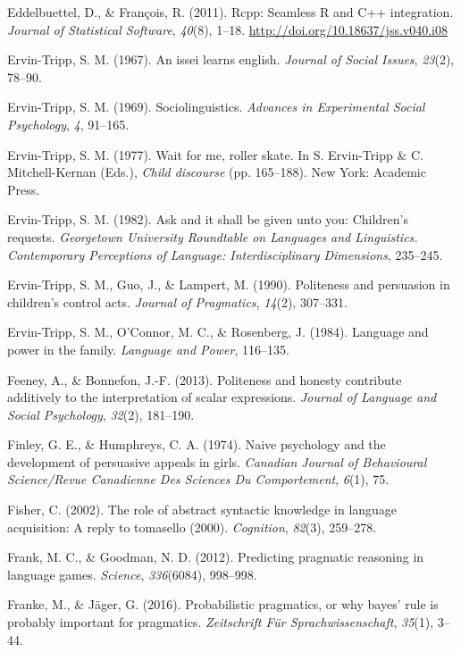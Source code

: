 \documentclass[oneside]{report}
\begin{document}
\hypertarget{ref-R-Rcpp_a}{}
Eddelbuettel, D., \& François, R. (2011). Rcpp: Seamless R and C++
integration. \emph{Journal of Statistical Software}, \emph{40}(8),
1--18. \url{http://doi.org/10.18637/jss.v040.i08}

\hypertarget{ref-ervin1967}{}
Ervin-Tripp, S. M. (1967). An issei learns english. \emph{Journal of
Social Issues}, \emph{23}(2), 78--90.

\hypertarget{ref-ervin1969}{}
Ervin-Tripp, S. M. (1969). Sociolinguistics. \emph{Advances in
Experimental Social Psychology}, \emph{4}, 91--165.

\hypertarget{ref-ervin1977}{}
Ervin-Tripp, S. M. (1977). Wait for me, roller skate. In S. Ervin-Tripp
\& C. Mitchell-Kernan (Eds.), \emph{Child discourse} (pp. 165--188). New
York: Academic Press.

\hypertarget{ref-ervin1982}{}
Ervin-Tripp, S. M. (1982). Ask and it shall be given unto you:
Children's requests. \emph{Georgetown University Roundtable on Languages
and Linguistics. Contemporary Perceptions of Language: Interdisciplinary
Dimensions}, 235--245.

\hypertarget{ref-ervin1990}{}
Ervin-Tripp, S. M., Guo, J., \& Lampert, M. (1990). Politeness and
persuasion in children's control acts. \emph{Journal of Pragmatics},
\emph{14}(2), 307--331.

\hypertarget{ref-ervin1984}{}
Ervin-Tripp, S. M., O'Connor, M. C., \& Rosenberg, J. (1984). Language
and power in the family. \emph{Language and Power}, 116--135.

\hypertarget{ref-feeney2013}{}
Feeney, A., \& Bonnefon, J.-F. (2013). Politeness and honesty contribute
additively to the interpretation of scalar expressions. \emph{Journal of
Language and Social Psychology}, \emph{32}(2), 181--190.

\hypertarget{ref-finley1974}{}
Finley, G. E., \& Humphreys, C. A. (1974). Naive psychology and the
development of persuasive appeals in girls. \emph{Canadian Journal of
Behavioural Science/Revue Canadienne Des Sciences Du Comportement},
\emph{6}(1), 75.

\hypertarget{ref-fisher2002}{}
Fisher, C. (2002). The role of abstract syntactic knowledge in language
acquisition: A reply to tomasello (2000). \emph{Cognition},
\emph{82}(3), 259--278.

\hypertarget{ref-frank2012}{}
Frank, M. C., \& Goodman, N. D. (2012). Predicting pragmatic reasoning
in language games. \emph{Science}, \emph{336}(6084), 998--998.

\hypertarget{ref-franke2016}{}
Franke, M., \& Jäger, G. (2016). Probabilistic pragmatics, or why bayes'
rule is probably important for pragmatics. \emph{Zeitschrift Für
Sprachwissenschaft}, \emph{35}(1), 3--44.
\end{document}

